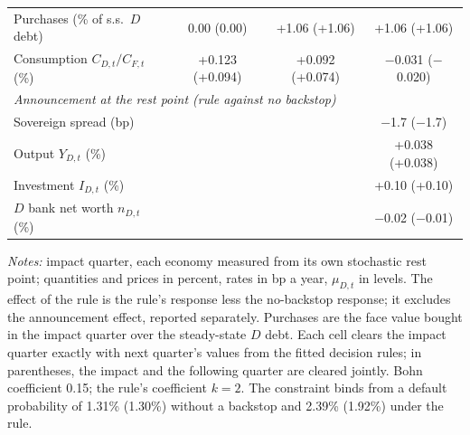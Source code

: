 \begin{table}[htbp]
\begin{tabular}{lccc}
Purchases (\% of s.s.\ $D$ debt) & 0.00 (0.00) & +1.06 (+1.06) & +1.06 (+1.06) \\
Consumption $C_{D,t}/C_{F,t}$ (\%) & +0.123 (+0.094) & +0.092 (+0.074) & $-$0.031 ($-$0.020) \\
\midrule
\multicolumn{4}{l}{\emph{Announcement at the rest point (rule against no backstop)}} \\
Sovereign spread (bp) & & & $-$1.7 ($-$1.7) \\
Output $Y_{D,t}$ (\%) & & & +0.038 (+0.038) \\
Investment $I_{D,t}$ (\%) & & & +0.10 (+0.10) \\
$D$ bank net worth $n_{D,t}$ (\%) & & & $-$0.02 ($-$0.01) \\
\bottomrule
\end{tabular}
\par\medskip
\begin{minipage}{0.95\linewidth}\footnotesize
\emph{Notes:} impact quarter, each economy measured from its own stochastic rest point; quantities and prices in percent, rates in bp a year, $\mu_{D,t}$ in levels. The effect of the rule is the rule's response less the no-backstop response; it excludes the announcement effect, reported separately. Purchases are the face value bought in the impact quarter over the steady-state $D$ debt. Each cell clears the impact quarter exactly with next quarter's values from the fitted decision rules; in parentheses, the impact and the following quarter are cleared jointly. Bohn coefficient 0.15; the rule's coefficient $k=2$. The constraint binds from a default probability of 1.31\% (1.30\%) without a backstop and 2.39\% (1.92\%) under the rule.
\end{minipage}
\end{table}
